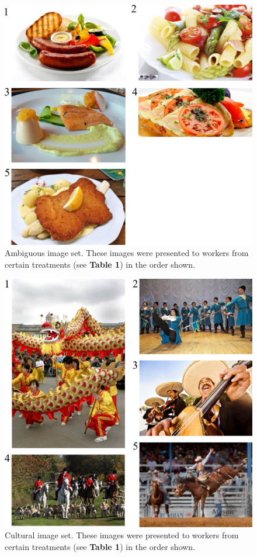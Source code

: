 \documentclass[letterpaper]{article}
\begin{document}
\begin{figure}
	\includegraphics[scale=1.00]{figs/taskImages/ambiguous.jpg}
	\caption{ Ambiguous image set. These images were presented to workers from 
		certain treatments (see \textbf{Table 1}) in the order shown.}
\end{figure}

\begin{figure}
	\includegraphics[scale=1.00]{figs/taskImages/cultural.jpg}
	\caption{Cultural image set. These images were presented to workers from 
		certain treatments (see \textbf{Table 1}) in the order shown.}
\end{figure}
\end{document}
